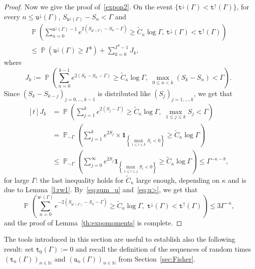 \documentclass[AHL,Unicode,longabstracts,published]{cedram}
\newcommand{\ind}{\mathbf{1}}
\newcommand{\bbN}{\mathbb{N}}
\newcommand{\gG}{\Gamma}
\renewcommand*\ss{\mathtt{u}}
\newcommand{\ttt}{\mathtt{t}}
\newcommand*\td{{\ttt}^\downarrow}
\newcommand*\tup{{\ttt}^\uparrow}
\newcommand{\tudown}{\ss^\downarrow}
\DeclareMathOperator{\p}{\mathbb{P}}
\begin{document}
\begin{proof}
Now we give the proof of~\eqref{expon2}. On the event $\{\td(\Gamma)< \tup(\Gamma)\}$, for every $n \le \tudown(\Gamma)$, $S_{\tudown(\Gamma)} - S_n < \Gamma$ and
\begin{multline}
\p\left(\sum_{n=0}^{\tudown(\Gamma)-1} e^{2\left(S_{\tudown(\gG)}-S_n-\Gamma\right)}
\ge \widetilde{C}_\kappa \log \Gamma, \,\td(\Gamma)< \tup(\Gamma)\right)\\
\le
\p\left(\tudown(\Gamma)\ge \Gamma^b\right) + \sum_{k=0}^{\Gamma^b-1} J_k,\label{eq:sum_u}
\end{multline}
where
\begin{equation}
J_k:= \p\left(\sum_{n=0}^{k-1} e^{2 \left(S_k-S_n-\Gamma\right)} \ge \widetilde{C}_\kappa \log \Gamma,\; \max_{0\le n < k} (S_k-S_n) < \Gamma\right).
\end{equation}
Since $(S_k-S_{k-j})_{j=0,\dots, k-1}$ is distributed like $(S_j)_{j=1,\dots, k}$, we get that
\begin{equation}
\begin{aligned}[t]
J_k &= \p\left(\sum_{j=1}^k e^{2 (S_j-\Gamma)} \ge \widetilde{C}_\kappa \log \Gamma,\; \max_{1\le j\le k} S_j < \Gamma \right)\\
&= \p_{-\Gamma}\left(\sum_{j=1}^k e^{2 S_j} \times \ind_{\left\{\max_{1\le i\le k} S_i< 0\right\}} \ge \widetilde{C}_\kappa \log \Gamma \right)
\\
&\le
\p_{-\Gamma}\left(\sum_{j=0}^\infty e^{2 S_j} \ind_{\left\{\max_{1\le i\le j} S_i< 0\right\}} \ge \widetilde{C}_\kappa \log \Gamma \right)
\le \Gamma^{-\kappa-b},
\end{aligned}
\end{equation}
\pagebreak{}
for large $\Gamma$: the last inequality holds for $\widetilde{C}_\kappa$ large enough, depending on $\kappa$ and is due to Lemma~\ref{l:rw1}. By~\eqref{eq:sum_u} and~\eqref{eq:u>}, we get that
\begin{equation}
\p\left(\sum_{n=0}^{\tudown(\Gamma)} e^{-2 (S_{\tudown(\Gamma)}-S_n-\gG)} \ge \widetilde{C}_\kappa\log \Gamma,\; \td(\Gamma)< \tup(\Gamma)\right) \le 3 \Gamma^{-\kappa},
\end{equation}
and the proof of Lemma~\ref{th:expomoments} is complete.
\end{proof}


The tools introduced in this section are useful to establish also the following result: set $\ttt_0(\Gamma):=0$ and recall the definition of the sequences of random times $(\ttt_n(\Gamma))_{n\in \bbN}$ and $(\ss_n(\Gamma))_{n\in \bbN}$ from Section~\ref{sec:Fisher}.
\end{document}
